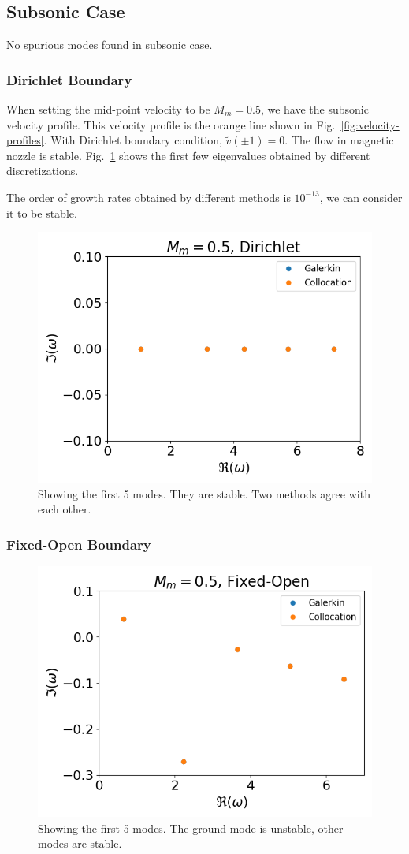 \subsection{Subsonic Case}
No spurious modes found in subsonic case.
\subsubsection*{Dirichlet Boundary}
When setting the mid-point velocity to be $M_m=0.5$, we have the subsonic velocity profile. This velocity profile is the orange line shown in Fig.~\ref{fig:velocity-profiles}. With Dirichlet boundary condition, $\tilde{v}(\pm 1) =0$. The flow in magnetic nozzle is stable. Fig.~\ref{fig:subsonic-dirichlet} shows the first few eigenvalues obtained by different discretizations.

The order of growth rates obtained by different methods is $10^{-13}$, we can consider it to be stable.
\begin{figure} [H]
	\centering
	\includegraphics[width=0.7\linewidth]{figures/subsonic-drichlet.png}
	\caption{Showing the first 5 modes. They are stable. Two methods agree with each other.}
	\label{fig:subsonic-dirichlet}
\end{figure}

\subsubsection*{Fixed-Open Boundary}
\begin{figure} [H]
	\centering
	\includegraphics[width=0.7\linewidth]{figures/subsonic-fixed-open.png}
	\caption{Showing the first 5 modes. The ground mode is unstable, other modes are stable.}
	\label{fig:subsonic-fixed-open}
\end{figure}

